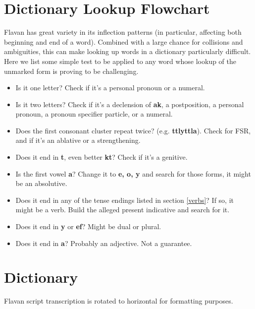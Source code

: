 \documentclass[10pt,oneside]{memoir}
\newcommand{\fsr}{FSR}
\begin{document}
\pagebreak
\section{Dictionary Lookup Flowchart}

Flavan has great variety in its inflection patterns (in particular, affecting both beginning and end of a word). Combined with a large chance for collisions and ambiguities, this can make looking up words in a dictionary particularly difficult. Here we list some simple test to be applied to any word whose lookup of the unmarked form is proving to be challenging.

\begin{itemize}
    \item Is it one letter? Check if it's a personal pronoun or a numeral.
    \item Is it two letters? Check if it's a declension of \textbf{ak}, a postposition, a personal pronoun, a pronoun specifier particle, or a numeral.
    \item Does the first consonant cluster repeat twice? (e.g. \textbf{ttlyttla}). Check for \fsr , and if it's an ablative or a strengthening.
    \item Does it end in \textbf{t}, even better \textbf{kt}? Check if it's a genitive.
    \item Is the first vowel \textbf{a}? Change it to \textbf{e, o, y} and search for those forms, it might be an absolutive.
    \item Does it end in any of the tense endings listed in section \ref{verbs}? If so, it might be a verb. Build the alleged present indicative and search for it.
    \item Does it end in \textbf{y} or \textbf{ef}? Might be dual or plural.
    \item Does it end in \textbf{a}? Probably an adjective. Not a guarantee.
\end{itemize}

\pagebreak

\section{Dictionary}

Flavan script transcription is rotated to horizontal for formatting purposes.

\begin{multicols}{3}

\end{multicols}
\end{document}
